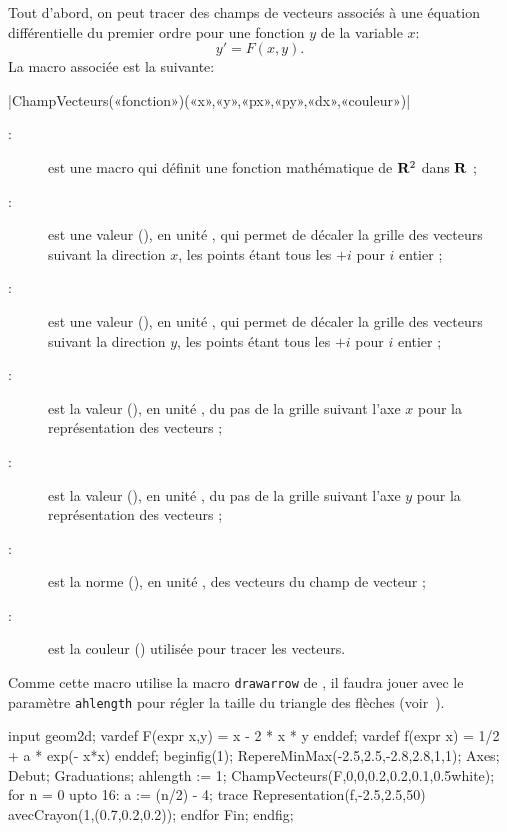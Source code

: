 \documentclass[a4paper,french]{article}
\begin{document}
Tout d'abord, on peut tracer des champs de vecteurs associés à une équation
différentielle du premier ordre pour une fonction $y$ de la variable $x$:
\[y'=F(x,y).\]
La macro associée est la suivante:
\begin{colourband}
  \macro|ChampVecteurs(«fonction»)(«x»,«y»,«px»,«py»,«dx»,«couleur»)|
  \begin{description}
    \item[:] est une macro \MP{} qui définit une fonction
    mathématique de $\mathbf{R}^2$ dans $\mathbf{R}$ ;
    \item[:] est une valeur (), en unité , qui permet de décaler la
    grille des vecteurs suivant la direction $x$, les points étant tous les
    $+i$ pour $i$ entier ;
    \item[:] est une valeur (), en unité , qui permet de décaler la
    grille des vecteurs suivant la direction $y$, les points étant tous les
    $+i$ pour $i$ entier ;
    \item[:] est la valeur (), en unité
    , du pas de la grille suivant l'axe $x$ pour
    la représentation des vecteurs ;
    \item[:] est la valeur (), en unité
    , du pas de la grille suivant l'axe $y$ pour
    la représentation des vecteurs ;
    \item[:] est la norme (), en unité
    , des vecteurs du champ de vecteur ;
    \item[:] est la couleur () utilisée pour tracer
    les vecteurs.
  \end{description}
\end{colourband}

Comme cette macro utilise la macro \lstinline+drawarrow+ de \MP{}, il faudra
jouer avec le paramètre \lstinline+ahlength+ pour régler la taille du triangle
des flèches (voir~\cite{ctan-metapost}).

\begin{ExempleMP}
input geom2d;
vardef F(expr x,y) = x - 2 * x * y enddef;
vardef f(expr x) = 1/2 + a * exp(- x*x) enddef;
beginfig(1);
RepereMinMax(-2.5,2.5,-2.8,2.8,1,1);
Axes;
Debut;
Graduations;
ahlength := 1;
ChampVecteurs(F,0,0,0.2,0.2,0.1,0.5white);
for n = 0 upto 16:
    a := (n/2) - 4;
    trace Representation(f,-2.5,2.5,50)
    avecCrayon(1,(0.7,0.2,0.2));
endfor
Fin;
endfig;
  \end{ExempleMP}
\end{document}
